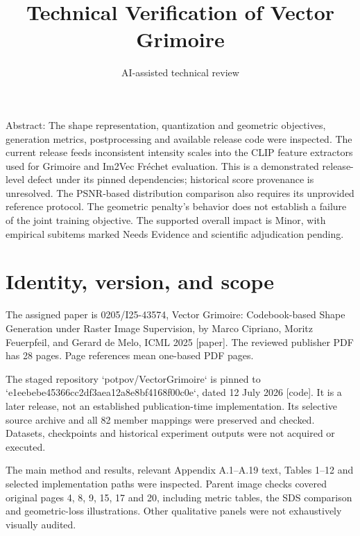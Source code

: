\documentclass[10pt]{article}
\title{Technical Verification of Vector Grimoire}
\author{AI-assisted technical review}
\date{}
\begin{document}
\maketitle
Abstract: The shape representation, quantization and geometric objectives, generation metrics, postprocessing and available release code were inspected. The current release feeds inconsistent intensity scales into the CLIP feature extractors used for Grimoire and Im2Vec Fréchet evaluation. This is a demonstrated release-level defect under its pinned dependencies; historical score provenance is unresolved. The PSNR-based distribution comparison also requires its unprovided reference protocol. The geometric penalty’s behavior does not establish a failure of the joint training objective. The supported overall impact is Minor, with empirical subitems marked Needs Evidence and scientific adjudication pending.\par
\section*{Identity, version, and scope}
The assigned paper is 0205/I25-43574, Vector Grimoire: Codebook-based Shape Generation under Raster Image Supervision, by Marco Cipriano, Moritz Feuerpfeil, and Gerard de Melo, ICML 2025 [paper]. The reviewed publisher PDF has 28 pages. Page references mean one-based PDF pages.\par
The staged repository `potpov/VectorGrimoire` is pinned to `e1eebebe45366cc2df3aea12a8e8bf4168f00c0e`, dated 12 July 2026 [code]. It is a later release, not an established publication-time implementation. Its selective source archive and all 82 member mappings were preserved and checked. Datasets, checkpoints and historical experiment outputs were not acquired or executed.\par
The main method and results, relevant Appendix A.1–A.19 text, Tables 1–12 and selected implementation paths were inspected. Parent image checks covered original pages 4, 8, 9, 15, 17 and 20, including metric tables, the SDS comparison and geometric-loss illustrations. Other qualitative panels were not exhaustively visually audited.\par
\end{document}
